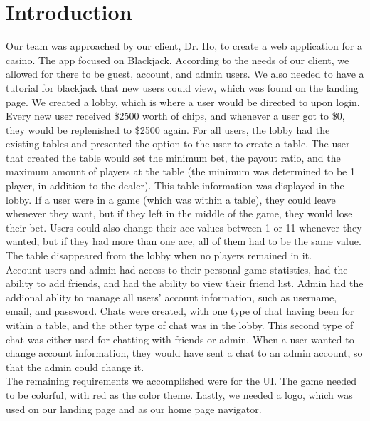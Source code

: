 \section{Introduction}

Our team was approached by our client, Dr. Ho, to create a web application for a casino. The app focused on Blackjack. According to the needs of our client, we allowed for there to be guest, account, and admin users. We also needed to have a tutorial for blackjack that new users could view, which was found on the landing page. We created a lobby, which is where a user would be directed to upon login. Every new user received \$2500 worth of chips, and whenever a user got to \$0, they would be replenished to \$2500 again. For all users, the lobby had the existing tables and presented the option to the user to create a table. The user that created the table would set the minimum bet, the payout ratio, and the maximum amount of players at the table (the minimum was determined to be 1 player, in addition to the dealer). This table information was displayed in the lobby. If a user were in a game (which was within a table), they could leave whenever they want, but if they left in the middle of the game, they would lose their bet. Users could also change their ace values between 1 or 11 whenever they wanted, but if they had more than one ace, all of them had to be the same value. The table disappeared from the lobby when no players remained in it. \\

\noindent Account users and admin had access to their personal game statistics, had the ability to add friends, and had the ability to view their friend list. Admin had the addional ablity to manage all users' account information, such as username, email, and password. Chats were created, with one type of chat having been for within a table, and the other type of chat was in the lobby. This second type of chat was either used for chatting with friends or admin. When a user wanted to change account information, they would have sent a chat to an admin account, so that the admin could change it. \\

\noindent The remaining requirements we accomplished were for the UI. The game needed to be colorful, with red as the color theme. Lastly, we needed a logo, which was used on our landing page and as our home page navigator.

